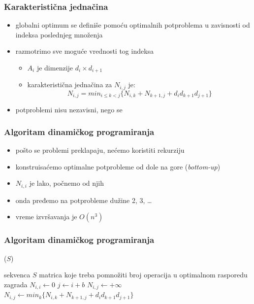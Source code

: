 \documentclass[compress]{beamer}
\begin{document}
\begin{frame}[fragile]
  \frametitle{Karakteristična jednačina}
  \begin{itemize}
    \item globalni optimum se definiše pomoću optimalnih potproblema u 
    zavisnosti od indeksa poslednjeg množenja
    \item razmotrimo sve moguće vrednosti tog indeksa
    \begin{itemize}
      \item $A_{i}$ je dimenzije $d_{i}\times d_{i+1}$
      \item karakteristična jednačina za $N_{i,j}$ je:
      $$ N_{i,j} = min_{i\leq k<j}\{ N_{i,k} + N_{k+1,j} + d_{i} d_{k+1} d_{j+1}\}$$
    \end{itemize}
    \item potproblemi nisu nezavisni, nego se 
  \end{itemize}
\end{frame}

\begin{frame}[fragile]
  \frametitle{Algoritam dinamičkog programiranja}
  \begin{itemize}
    \item pošto se problemi preklapaju, nećemo koristiti rekurziju
    \item konstruisaćemo optimalne potprobleme od dole na gore (\textit{bottom-up})
    \item $N_{i,i}$ je lako, počnemo od njih
    \item onda pređemo na potprobleme dužine 2, 3, \ldots{}
    \item vreme izvršavanja je $O(n^3)$
  \end{itemize}
\end{frame}

\begin{frame}
  \frametitle{Algoritam dinamičkog programiranja}
  ($S$)
  \begin{algorithmic}
    \REQUIRE sekvenca $S$ matrica koje treba pomnožiti
    \ENSURE broj operacija u optimalnom rasporedu zagrada
      \STATE $N_{i,i} \leftarrow 0$
    \ENDFOR
        \STATE $j \leftarrow i+b$
        \STATE $N_{i,j} \leftarrow +\infty$
          \STATE $N_{i,j} \leftarrow min_{k} \{ N_{i,k} + N_{k+1,j} + d_{i} d_{k+1} d_{j+1}\}$
        \ENDFOR
      \ENDFOR
    \ENDFOR
  \end{algorithmic}    
\end{frame}
\end{document}
